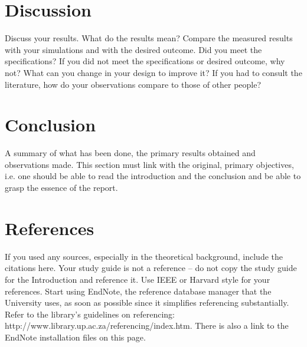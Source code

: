 \documentclass[a4paper,12pt]{report}
\begin{document}
\section{Discussion}

Discuss your results. What do the results mean? Compare the measured results with your simulations and with the desired outcome. Did you meet the specifications? If you did not meet the specifications or desired outcome, why not? What can you change in your design to improve it? If you had to consult the literature, how do your observations compare to those of other people?

\section{Conclusion}
A summary of what has been done, the primary results obtained and observations made.  This section must link with the original, primary objectives, i.e. one should be able to read the introduction and the conclusion and be able to grasp the essence of the report.  

\section{References}

If you used any sources, especially in the theoretical background, include the citations here. Your study guide is not a reference – do not copy the study guide for the Introduction and reference it. 
Use IEEE or Harvard style for your references. 
Start using EndNote, the reference database manager that the University uses, as soon as possible since it simplifies referencing substantially. Refer to the library's guidelines on referencing: http://www.library.up.ac.za/referencing/index.htm. There is also a link to the EndNote installation files on this page.
\end{document}
